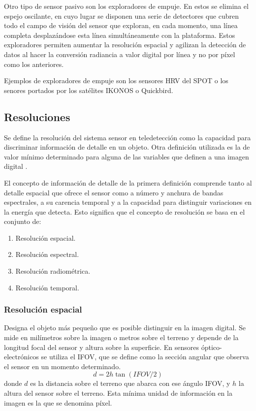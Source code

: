 Otro tipo de sensor pasivo son los exploradores de empuje. En estos se elimina el espejo oscilante, en cuyo lugar se disponen una serie de detectores que cubren todo el campo de visión del sensor que exploran, en cada momento, una línea completa desplazándose esta línea simultáneamente con la plataforma. Estos exploradores permiten aumentar la resolución espacial y agilizan la detección de datos al hacer la conversión radiancia a valor digital por línea y no por píxel como los anteriores.\Sep

Ejemplos de exploradores de empuje son los sensores \ac{HRV} del SPOT o los senores portados por los satélites IKONOS o Quickbird.

\subsection{Resoluciones}

Se define la resolución del sistema sensor en teledetección como la capacidad para discriminar información de detalle en un objeto. Otra definición utilizada es la de valor mínimo determinado para alguna de las variables que definen a una imagen digital \citep{chuvieco2002teledeteccion} .\Sep

El concepto de información de detalle de la primera definición comprende tanto al detalle espacial que ofrece el sensor como a número y anchura de bandas espectrales, a su carencia temporal y a la capacidad para distinguir variaciones en la energía que detecta. Esto significa que el concepto de resolución se basa en el conjunto de:
\begin{enumerate}
	\item Resolución espacial.
	\item Resolución espectral.
	\item Resolución radiométrica.
	\item Resolución temporal.
\end{enumerate}

\subsubsection{Resolución espacial}
Designa el objeto más pequeño que es posible distinguir en la imagen digital. Se mide en milímetros sobre la imagen o metros sobre el terreno y depende de la longitud focal del sensor y altura sobre la superficie. En sensores óptico-electrónicos se utiliza el \ac{IFOV}, que se define como la sección angular que observa el sensor en un momento determinado.
\begin{equation}
	d=2h\tan(IFOV/2)
	\label{eq:res_esp}
\end{equation}
donde $d$ es la distancia sobre el terreno que abarca con ese ángulo \ac{IFOV}, y $h$ la altura del sensor sobre el terreno. Esta mínima unidad de información en la imagen es la que se denomina píxel.\Sep

